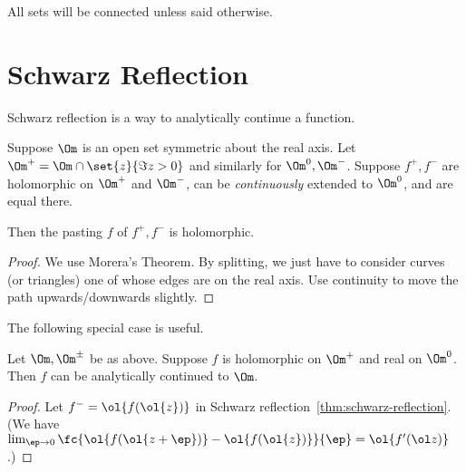 \def\filepath{C:/Users/Owner/Dropbox/Math/templates}





%


%

\pagestyle{fancy}
\chead{} 
\rhead{} 
\lfoot{} 
\cfoot{\thepage} 
\rfoot{} 
\renewcommand{\headrulewidth}{.3pt} 
\setlength\voffset{0in}
\setlength\textheight{648pt}



All sets will be connected unless said otherwise.
\section{Schwarz Reflection}
Schwarz reflection is a way to analytically continue a function.

\begin{thm}
Suppose $\Om$ is an open set symmetric about the real axis. Let $\Om^+=\Om\cap \set{z}{\Im z>0}$ and similarly for $\Om^0,\Om^-$. Suppose $f^+,f^-$ are holomorphic on $\Om^+$ and $\Om^-$, can be {\it continuously} extended to $\Om^0$, and are equal there. 

Then the pasting $f$ of $f^+,f^-$ is holomorphic.
\end{thm}
\begin{proof}
We use Morera's Theorem. By splitting, we just have to consider curves (or triangles) one of whose edges are on the real axis. Use continuity to move the path upwards/downwards slightly.
\end{proof}

The following special case is useful.

\begin{cor}
Let $\Om, \Om^{\pm}$ be as above. 
Suppose $f$ is holomorphic on $\Om^+$ and real on $\Om^0$. Then $f$ can be analytically continued to $\Om$.
\end{cor}
\begin{proof}
Let $f^-=\ol{f(\ol{z})}$ in Schwarz reflection~\ref{thm:schwarz-reflection}. (We have $\lim_{\ep\to 0}\fc{\ol{f(\ol{z+\ep})}-\ol{f(\ol{z})}}{\ep}=\ol{f'(\ol z)}$.)
\end{proof}

